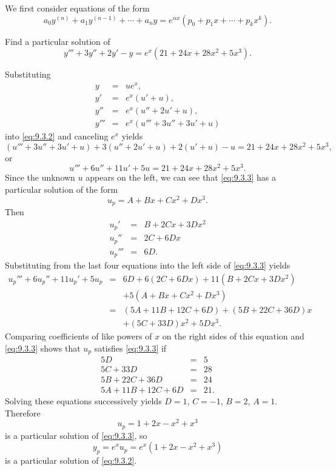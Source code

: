 \documentclass{ximera}
\begin{document}
We  first consider  equations of the form
$$
a_0y^{(n)}+a_1y^{(n-1)}+\cdots+a_ny=e^{\alpha
x}\left(p_0+p_1x+\cdots+p_kx^k\right).
$$

\begin{example}\label{example:9.3.1}
Find a particular solution of
\begin{equation} \label{eq:9.3.2}
y'''+3y''+2y'-y=e^x(21+24x+28x^2+5x^3).
\end{equation}


\begin{explanation} Substituting
\begin{eqnarray*}
y&=&ue^x,\\ y'&=&e^x(u'+u),\\
y''&=&e^x(u''+2u'+u),\\
y'''&=&e^x(u'''+3u''+3u'+u)
\end{eqnarray*}
into \eqref{eq:9.3.2} and canceling $e^x$ yields
$$
(u'''+3u''+3u'+u)+3(u''+2u'+u)+2(u'+u)-u
=21+24x+28x^2+5x^3,
$$
or
\begin{equation} \label{eq:9.3.3}
u'''+6u''+11u'+5u=21+24x+28x^2+5x^3.
\end{equation}
Since the unknown $u$ appears on the left, we can see that
\eqref{eq:9.3.3} has a particular solution of the form
$$
u_p=A+Bx+Cx^2+Dx^3.
$$
Then
\begin{eqnarray*}
u_p'&=&B+2Cx+3Dx^2\\
u_p''&=&2C+6Dx\\
u_p'''&=&6D.
\end{eqnarray*}
Substituting from the last four equations  into the left side of
\eqref{eq:9.3.3} yields
\begin{eqnarray*}
u_p'''+6u_p''+11u_p'+5u_p&=&6D+6(2C+6Dx)+11(B+2Cx+3Dx^2)\\
&&+5(A+Bx+Cx^2+Dx^3)\\
&=&(5A+11B+12C+6D)+(5B+22C+36D)x\\&&+(5C+33D)x^2+5Dx^3.
\end{eqnarray*}
Comparing coefficients of like powers of $x$ on the right sides of
this equation and \eqref{eq:9.3.3} shows that $u_p$ satisfies \eqref{eq:9.3.3}
if
$$
\begin{array}{rcr}
5D&=&5\\
5C+33D&=&28\\
5B+22C+36D&=&24\\
5A+11B+12C+6D&=&21.
\end{array}
$$
Solving these equations successively yields $D=1$, $C=-1$, $B=2$, $A=1$.
Therefore
$$
u_p=1+2x-x^2+x^3
$$
is a particular solution of  \eqref{eq:9.3.3}, so
$$
y_p=e^xu_p=e^x(1+2x-x^2+x^3)
$$
is a particular solution of  \eqref{eq:9.3.2}.


\end{explanation}
\end{example}
\end{document}
